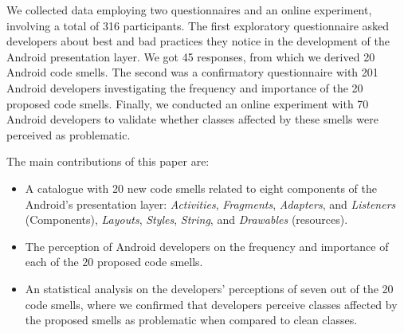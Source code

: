 We collected data employing two questionnaires and an online experiment, involving a total of 316 participants. The first exploratory questionnaire asked developers about best and bad practices they notice in the development of the Android presentation layer. We got 45 responses, from which we derived 20 Android code smells. The second was a confirmatory questionnaire with 201 Android developers investigating the frequency and importance of the 20 proposed code smells. Finally, we conducted an online experiment with 70 Android developers to validate whether classes affected by these smells were perceived as problematic.


The main contributions of this paper are:

\begin{itemize}
  \item A catalogue with 20 new code smells related to eight components of the Android's presentation layer: \textit{Activities}, \textit{Fragments}, \textit{Adapters}, and \textit{Listeners} (Components), \textit{Layouts}, \textit{Styles}, \textit{String}, and \textit{Drawables} (resources).
  
  \item The perception of Android developers on the frequency and importance of each of the 20 proposed code smells.

  \item An statistical analysis on the developers' perceptions of seven out of the 20 code smells, where we confirmed that developers perceive classes affected by the proposed smells as problematic when compared to clean classes.
\end{itemize}




